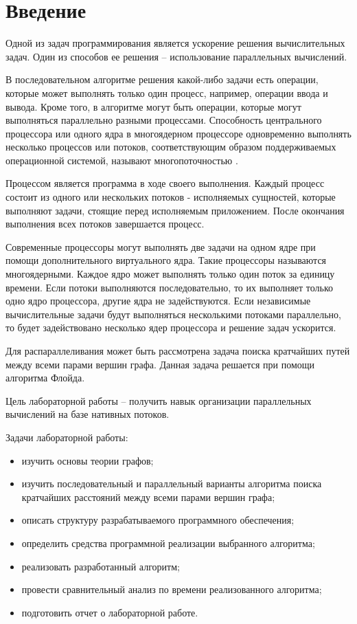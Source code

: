 \chapter*{Введение}


Одной из задач программирования является ускорение решения вычислительных задач. Один из способов ее решения -- использование параллельных вычислений.

В последовательном алгоритме решения какой-либо задачи есть операции, которые может выполнять только один процесс, например, операции ввода и вывода. Кроме того, в алгоритме могут быть операции, которые могут выполняться параллельно разными процессами. Способность центрального процессора или одного ядра в многоядерном процессоре одновременно выполнять несколько процессов или потоков, соответствующим образом поддерживаемых операционной системой, называют многопоточностью \cite{multithreading}.

Процессом является программа в ходе своего выполнения. Каждый процесс состоит из одного или нескольких потоков - исполняемых сущностей, которые выполняют задачи, стоящие перед исполняемым приложением. После окончания выполнения всех потоков завершается процесс.

Современные процессоры могут выполнять две задачи на одном ядре при помощи дополнительного виртуального ядра. Такие процессоры называются многоядерными. Каждое ядро может выполнять только один поток за единицу времени. Если потоки выполняются последовательно, то их выполняет только одно ядро процессора, другие ядра не задействуются. Если независимые вычислительные задачи будут выполняться несколькими потоками параллельно, то будет задействовано несколько ядер процессора и решение задач ускорится.

Для распараллеливания может быть рассмотрена задача поиска кратчайших путей между всеми парами вершин графа. Данная задача решается при помощи алгоритма Флойда.

Цель лабораторной работы -- получить навык организации параллельных вычислений на базе нативных потоков.

Задачи лабораторной работы:
\begin{itemize}
	\item изучить основы теории графов;
	\item изучить последовательный и параллельный варианты алгоритма поиска кратчайших расстояний между всеми парами вершин графа;
	\item описать структуру разрабатываемого программного обеспечения;
	\item определить средства программной реализации выбранного алгоритма;
	\item реализовать разработанный алгоритм;
	\item провести сравнительный анализ по времени реализованного алгоритма;
	\item подготовить отчет о лабораторной работе.
\end{itemize}


